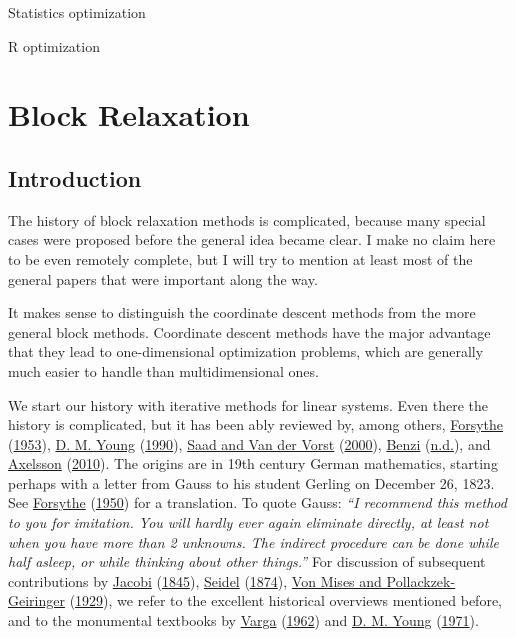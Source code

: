 \documentclass[
  12pt,
]{book}
\begin{document}
Statistics optimization

R optimization

\hypertarget{blockrelaxation}{%
\chapter{Block Relaxation}\label{blockrelaxation}}

\hypertarget{blockrelaxation:introduction}{%
\section{Introduction}\label{blockrelaxation:introduction}}

The history of block relaxation methods is complicated, because many special cases were proposed before the general idea became clear. I make no claim here to be even remotely complete, but I will try to mention at least most of the general papers that were important along the way.

It makes sense to distinguish the coordinate descent methods from the more general block methods. Coordinate descent methods have the major advantage that they lead to one-dimensional optimization problems, which are generally much easier to handle than multidimensional ones.

We start our history with iterative methods for linear systems. Even there the history is complicated, but it has been ably reviewed by, among others, \protect\hyperlink{ref-forsythe_53}{Forsythe} (\protect\hyperlink{ref-forsythe_53}{1953}), \protect\hyperlink{ref-young_90}{D. M. Young} (\protect\hyperlink{ref-young_90}{1990}), \protect\hyperlink{ref-saad_vandervorst_00}{Saad and Van der Vorst} (\protect\hyperlink{ref-saad_vandervorst_00}{2000}), \protect\hyperlink{ref-benzi_09}{Benzi} (\protect\hyperlink{ref-benzi_09}{n.d.}), and \protect\hyperlink{ref-axelsson_10}{Axelsson} (\protect\hyperlink{ref-axelsson_10}{2010}). The origins are
in 19th century German mathematics, starting perhaps with a letter from Gauss to his student Gerling on December 26, 1823. See \protect\hyperlink{ref-forsythe_50}{Forsythe} (\protect\hyperlink{ref-forsythe_50}{1950}) for a translation. To quote Gauss: \emph{``I recommend this method to you for imitation. You will hardly ever again eliminate directly, at least not when you have more than 2 unknowns. The indirect procedure can be done while half asleep, or while thinking about other things.''} For discussion of subsequent contributions by \protect\hyperlink{ref-jacobi_45}{Jacobi} (\protect\hyperlink{ref-jacobi_45}{1845}), \protect\hyperlink{ref-seidel_74}{Seidel} (\protect\hyperlink{ref-seidel_74}{1874}), \protect\hyperlink{ref-vonmises_pollackzek-geiringer_29}{Von Mises and Pollackzek-Geiringer} (\protect\hyperlink{ref-vonmises_pollackzek-geiringer_29}{1929}),
we refer to the excellent historical overviews mentioned before, and to the monumental textbooks by \protect\hyperlink{ref-varga_62}{Varga} (\protect\hyperlink{ref-varga_62}{1962}) and \protect\hyperlink{ref-young_71}{D. M. Young} (\protect\hyperlink{ref-young_71}{1971}).
\end{document}
